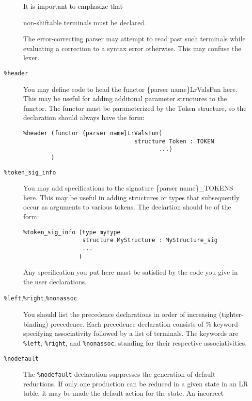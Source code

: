 \begin{description}
It is important to emphasize that
\begin{em}
non-shiftable terminals must be declared.
\end{em}
The error-correcting parser may attempt to read past such terminals
while evaluating a correction to a syntax error otherwise.  This may
confuse the lexer.
\item[{\tt \%header}]
\begin{samepage}
You may define code to head the functor \{parser name\}LrValsFun here.  This
may be useful for adding additonal parameter structures to the functor.
The functor must be parameterized by the Token structure, so
the declaration should always have the form:
\begin{tt}
\begin{verbatim}
%header (functor {parser name}LrValsFun(
                                structure Token : TOKEN
                                       ...) 
        )
\end{verbatim}
\end{tt}
\end{samepage}
\item[{\tt \%token\_sig\_info}]
\begin{samepage}
You may add specifications to the signature \{parser name\}_TOKENS
here.  This may be useful in adding structures or types that
subsequently occur as arguments to various tokens.  The declartion
should be of the form:
\begin{tt}
\begin{verbatim}
%token_sig_info (type mytype
                 structure MyStructure : MyStructure_sig
                 ...
                )
\end{verbatim}
\end{tt}
Any specification you put here must be satisfied by the code you give
in the user declarations.%
\end{samepage}
\item[{\tt \%left},{\tt \%right},{\tt \%nonassoc}]
You should list the precedence declarations in order of increasing (tighter-binding)
 precedence.  Each precedence declaration consists
of \% keyword specifying associativity followed by a list of terminals.
The keywords are {\tt \%left}, {\tt \%right}, and {\tt \%nonassoc},
standing for their respective associativities.
\item[{\tt \%nodefault}]
The {\tt \%nodefault} declaration suppresses the generation of default
reductions.  If only one production can be reduced in a given state in
an LR table, it may be made the default action for the state.  An incorrect

\end{description}
